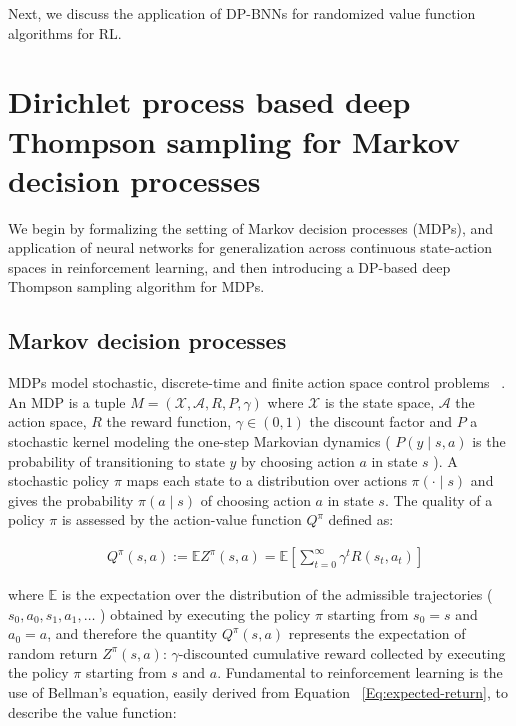 \documentclass[10pt]{article}
\begin{document}
Next, we discuss the application of DP-BNNs for randomized value function algorithms for RL. 


\section{Dirichlet process based deep Thompson sampling for Markov decision processes }
\label{sec:DP-BNN-randomized-value-functions}

We begin by formalizing the setting of Markov decision processes (MDPs), and application of neural networks for generalization across continuous state-action spaces in reinforcement learning, and then introducing a DP-based deep Thompson sampling algorithm for MDPs.

\subsection{Markov decision processes}
MDPs model stochastic, discrete-time and finite action space control problems ~\citep{puterman1990markov}. An MDP is a tuple $M=(\mathcal{X}, \mathcal{A}, R, P, \gamma)$ where $\mathcal{X}$ is the state space, $\mathcal{A}$ the action space, $R$ the reward function, $\gamma \in (0,1) $ the discount factor and $P$ a stochastic kernel modeling the one-step Markovian dynamics ( $P(y \mid s, a)$ is the probability of transitioning to state $y$ by choosing action $a$ in state $s$ ). A stochastic policy $\pi$ maps each state to a distribution over actions $\pi(\cdot \mid s)$ and gives the probability $\pi(a \mid s)$ of choosing action $a$ in state $s$. The quality of a policy  $\pi$ is assessed by the action-value function $Q^{\pi}$ defined as:


\begin{align}\label{Eq:expected-return}
& Q^{\pi}(s, a):=\mathbb{E} Z^{\pi}(s, a)=\mathbb{E}\left[\sum_{t=0}^{\infty} \gamma^{t} R\left(s_{t}, a_{t}\right)\right]
\end{align}

where $\mathbb{E}$ is the expectation over the distribution of the admissible trajectories ( $s_{0}, a_{0}, s_{1}, a_{1}, \ldots$ ) obtained by executing the policy $\pi$ starting from $s_{0}=s$ and $a_{0}=a$, and therefore the quantity $Q^{\pi}(s, a)$ represents the expectation of random return $Z^{\pi}(s,a)$: $\gamma$-discounted cumulative reward collected by executing the policy $\pi$ starting from $s$ and $a$.  Fundamental to reinforcement learning is the use of Bellman's equation, easily derived from Equation ~\ref{Eq:expected-return}, to describe the value function:
\end{document}
